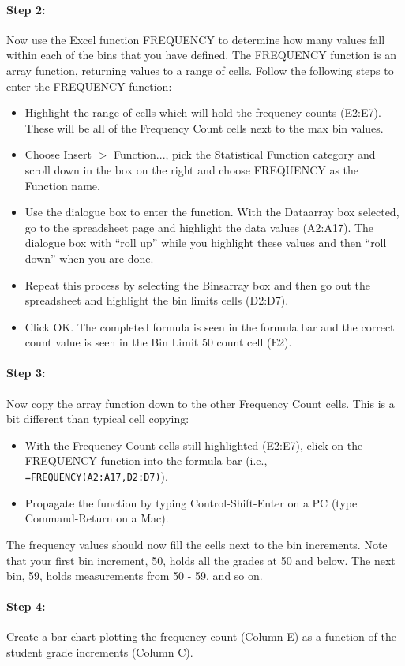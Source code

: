 \paragraph{Step 2:} Now use the Excel function FREQUENCY to determine how many values fall within each of the bins that you have defined. 
The FREQUENCY function is an array function, returning values to a range of cells. 
Follow the following steps to enter the FREQUENCY function:
\begin{itemize}
\item Highlight the range of cells which will hold the frequency counts (E2:E7). These will be all of the Frequency Count cells next to the max bin values.
\item Choose Insert $>$ Function..., pick the Statistical Function category and scroll down in the box on the right and choose FREQUENCY as the Function name.
\item Use the dialogue box to enter the function. With the Data\textunderscore array box selected, go to the spreadsheet page and highlight the data values (A2:A17). The dialogue box with ``roll up'' while you highlight these values and then ``roll down'' when you are done.
\item Repeat this process by selecting the Bins\textunderscore array box and then go out the spreadsheet and highlight the bin limits cells (D2:D7).
\item Click OK. The completed formula is seen in the formula bar and the correct count value is seen in the Bin Limit 50 count cell (E2).
\end{itemize}
\paragraph{Step 3:} Now copy the array function down to the other Frequency Count cells. 
This is a bit different than typical cell copying:
\begin{itemize}
\item With the Frequency Count cells still highlighted (E2:E7), click on the FREQUENCY function into the formula bar (i.e., \texttt{=FREQUENCY(A2:A17,D2:D7)}).
\item Propagate the function by typing Control-Shift-Enter on a PC (type Command-Return on a Mac).
\end{itemize}
The frequency values should now fill the cells next to the bin increments. 
Note that your first bin increment, 50, holds all the grades at 50 and below. 
The next bin, 59, holds measurements from 50 - 59, and so on.
\paragraph{Step 4:} Create a bar chart plotting the frequency count (Column E) as a function of the student grade increments (Column C).